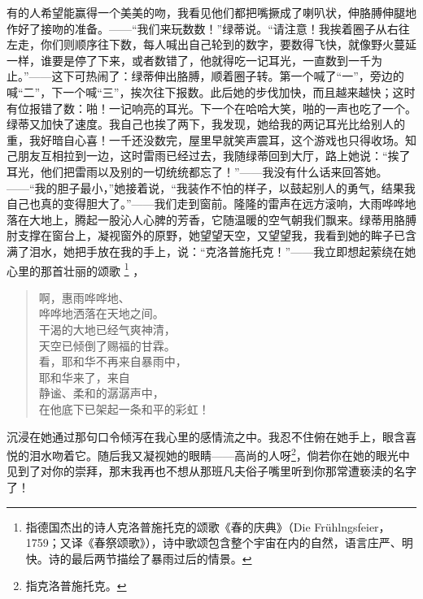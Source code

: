\documentclass[12pt,oneside]{book}
\begin{document}
有的人希望能赢得一个美美的吻，我看见他们都把嘴撅成了喇叭状，伸胳膊伸腿地作好了接吻的准备。——“我们来玩数数！”绿蒂说。“请注意！我挨着圈子从右往左走，你们则顺序往下数，每人喊出自己轮到的数字，要数得飞快，就像野火蔓延一样，谁要是停了下来，或者数错了，他就得吃一记耳光，一直数到一千为止。”——这下可热闹了：绿蒂伸出胳膊，顺着圈子转。第一个喊了“一”，旁边的喊“二”，下一个喊“三”，挨次往下报数。此后她的步伐加快，而且越来越快；这时有位报错了数：啪！一记响亮的耳光。下一个在哈哈大笑，啪的一声也吃了一个。绿蒂又加快了速度。我自己也挨了两下，我发现，她给我的两记耳光比给别人的重，我好暗自心喜！一千还没数完，屋里早就笑声震耳，这个游戏也只得收场。知己朋友互相拉到一边，这时雷雨已经过去，我随绿蒂回到大厅，路上她说：“挨了耳光，他们把雷雨以及别的一切统统都忘了！”——我没有什么话来回答她。——“我的胆子最小，”她接着说，“我装作不怕的样子，以鼓起别人的勇气，结果我自己也真的变得胆大了。”——我们走到窗前。隆隆的雷声在远方滚响，大雨哗哗地落在大地上，腾起一股沁人心脾的芳香，它随温暖的空气朝我们飘来。绿蒂用胳膊肘支撑在窗台上，凝视窗外的原野，她望望天空，又望望我，我看到她的眸子已含满了泪水，她把手放在我的手上，说：“克洛普施托克！”——我立即想起萦绕在她心里的那首壮丽的颂歌 \footnote{指德国杰出的诗人克洛普施托克的颂歌《春的庆典》（Die Frühlngsfeier，1759；又译《春祭颂歌》），诗中歌颂包含整个宇宙在内的自然，语言庄严、明快。诗的最后两节描绘了暴雨过后的情景。} ，


\begin{flushright}
\begin{framed}
\begin{verse}
啊，惠雨哗哗地、 \\
哗哗地洒落在天地之间。 \\
干渴的大地已经气爽神清， \\
天空已倾倒了赐福的甘霖。 \\
\vspace*{1em}
看，耶和华不再来自暴雨中， \\
耶和华来了，来自 \\
静谧、柔和的潺潺声中， \\
在他底下已架起一条和平的彩虹！ \\
\end{verse}
\end{framed}
\end{flushright}

沉浸在她通过那句口令倾泻在我心里的感情流之中。我忍不住俯在她手上，眼含喜悦的泪水吻着它。随后我又凝视她的眼睛——高尚的人呀\footnote{指克洛普施托克。}，倘若你在她的眼光中见到了对你的崇拜，那末我再也不想从那班凡夫俗子嘴里听到你那常遭亵渎的名字了！
\end{document}
